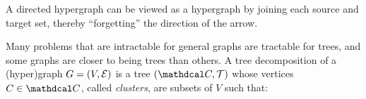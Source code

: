 A directed hypergraph 
can be viewed as a hypergraph
by joining
each source and target set,
thereby ``forgetting'' the direction of the arrow.

Many problems that are intractable for general graphs
are tractable for trees, and
some graphs are closer to being trees than others.
%
A tree decomposition of a (hyper)graph $G = (V, \mathcal E)$ is a tree $(\C, \mathcal T)$ whose vertices $C \in \C$, called
\emph{clusters}, are subsets of $V$ such that:

